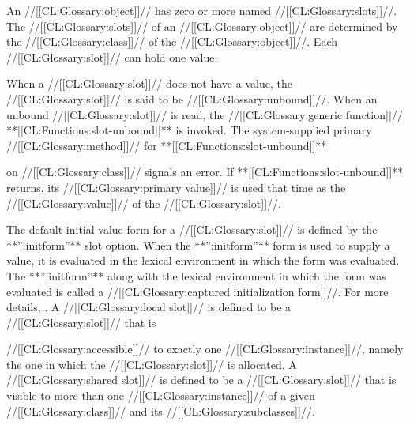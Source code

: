 

                     An //[[CL:Glossary:object]]//  has zero or more named //[[CL:Glossary:slots]]//.  The //[[CL:Glossary:slots]]// of an //[[CL:Glossary:object]]// are determined  by the //[[CL:Glossary:class]]// of the //[[CL:Glossary:object]]//.  Each //[[CL:Glossary:slot]]// can hold one value. %

When a //[[CL:Glossary:slot]]// does not have a value, the //[[CL:Glossary:slot]]// is said to be  //[[CL:Glossary:unbound]]//.  When an unbound //[[CL:Glossary:slot]]// is read,  the //[[CL:Glossary:generic function]]// **[[CL:Functions:slot-unbound]]** is invoked. The  system-supplied primary //[[CL:Glossary:method]]//  for **[[CL:Functions:slot-unbound]]** 

on //[[CL:Glossary:class]]//  signals an error.  If **[[CL:Functions:slot-unbound]]** returns, its //[[CL:Glossary:primary value]]//  is used that time as the //[[CL:Glossary:value]]// of the //[[CL:Glossary:slot]]//.

The default initial value form for a //[[CL:Glossary:slot]]// is defined by the **'':initform''** slot option.  When the **'':initform''** form is used to supply a value, it is evaluated in the lexical environment in which the  form was evaluated. The **'':initform''** along with the lexical environment in which the  form was evaluated is called a //[[CL:Glossary:captured initialization form]]//.  For more details, \seesection\ObjectCreationAndInit.
              A //[[CL:Glossary:local slot]]// is defined to be a //[[CL:Glossary:slot]]// that is

//[[CL:Glossary:accessible]]// to exactly one //[[CL:Glossary:instance]]//,  namely the one in which the //[[CL:Glossary:slot]]// is allocated.   A //[[CL:Glossary:shared slot]]// is defined to be a //[[CL:Glossary:slot]]// that is visible to more than one //[[CL:Glossary:instance]]// of a given //[[CL:Glossary:class]]// and its //[[CL:Glossary:subclasses]]//.

